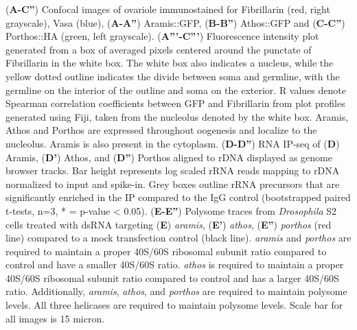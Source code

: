 \documentclass[12pt,oneside]{reedthesis}
\begin{document}
(\textbf{A-C''}) Confocal images of ovariole
immunostained for Fibrillarin (red, right grayscale), Vasa (blue),
(\textbf{A-A''}) Aramis::GFP, (\textbf{B-B''}) Athos::GFP and (\textbf{C-C''})
Porthos::HA (green, left grayscale). (\textbf{A'''-C'''}) Fluorescence
intensity plot generated from a box of averaged pixels centered around
the punctate of Fibrillarin in the white box. The white box also
indicates a nucleus, while the yellow dotted outline indicates the
divide between soma and germline, with the germline on the interior of
the outline and soma on the exterior. R values denote Spearman
correlation coefficients between GFP and Fibrillarin from plot profiles
generated using Fiji, taken from the nucleolus denoted by the white box.
Aramis, Athos and Porthos are expressed throughout oogenesis and
localize to the nucleolus. Aramis is also present in the cytoplasm.
(\textbf{D-D''}) RNA IP-seq of (\textbf{D}) Aramis, (\textbf{D'}) Athos, and (\textbf{D''})
Porthos aligned to rDNA displayed as genome browser tracks. Bar height
represents log scaled rRNA reads mapping to rDNA normalized to input and
spike-in. Grey boxes outline rRNA precursors that are significantly
enriched in the IP compared to the IgG control (bootstrapped paired
t-tests, n=3, * = p-value \textless{} 0.05). (\textbf{E-E''}) Polysome traces from
\emph{Drosophila} S2 cells treated with dsRNA targeting (\textbf{E}) \emph{aramis},
(\textbf{E'}) \emph{athos}, (\textbf{E''}) \emph{porthos} (red line) compared to a mock
transfection control (black line). \emph{aramis} and \emph{porthos} are required
to maintain a proper 40S/60S ribosomal subunit ratio compared to control
and have a smaller 40S/60S ratio. \emph{athos} is required to maintain a
proper 40S/60S ribosomal subunit ratio compared to control and has a
larger 40S/60S ratio. Additionally, \emph{aramis}, \emph{athos}, and \emph{porthos} are
required to maintain polysome levels. All three helicases are required
to maintain polysome levels. Scale bar for all images is 15 micron.

\textbf{\hfill\break
}
\end{document}
